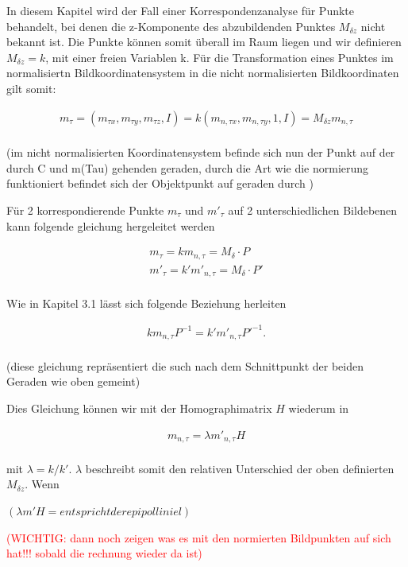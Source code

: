  In diesem Kapitel wird der Fall einer Korrespondenzanalyse für Punkte behandelt, bei denen die z-Komponente des abzubildenden Punktes $M_{\delta z}$ nicht bekannt ist. Die Punkte können somit überall im Raum liegen und wir definieren $M_{\delta z}=k$, mit einer freien Variablen k. Für die Transformation eines Punktes im normalisiertn Bildkoordinatensystem in die nicht normalisierten Bildkoordinaten gilt somit:
 
 \begin{gather}
 	m_{\tau}=(m_{\tau x},m_{\tau y},m_{\tau z}, I) = k(m_{n,\tau x},m_{n,\tau y},1, I)=M_{\delta z}m_{n,\tau}
 \end{gather}\\
 (im nicht normalisierten Koordinatensystem befinde sich nun der Punkt auf der durch C und m(Tau) gehenden geraden, durch die Art wie die normierung funktioniert befindet sich der Objektpunkt auf geraden durch )
 
 
 
 Für 2 korrespondierende Punkte $m_{\tau}$ und $m'_{\tau}$ auf 2 unterschiedlichen Bildebenen kann folgende gleichung hergeleitet werden
 
 
 \begin{gather}
 	m_{\tau}=km_{n,\tau} = M_{\delta} \cdot P \\
 	m'_{\tau}=k'm'_{n,\tau} = M_{\delta} \cdot P'
 \end{gather}\\
 
 Wie in Kapitel 3.1 lässt sich folgende Beziehung herleiten
 
 \begin{gather}
 	km_{n,\tau}P^{-1}  = k'm'_{n,\tau}P'^{-1}.
 \end{gather}\\
 (diese gleichung repräsentiert die such nach dem Schnittpunkt der beiden Geraden wie oben gemeint)\
 
 Dies Gleichung können wir mit der Homographimatrix $H$ wiederum in 
 
 \begin{gather}
 	m_{n,\tau} =\lambda  m'_{n,\tau}H
 \end{gather}\\
 
 mit $\lambda=k/k'$. $\lambda$ beschreibt somit den relativen Unterschied der oben definierten $M_{\delta z}$. Wenn  
 
 $(\lambda m'H  =entspricht der epipollinie l)$


\textcolor{red}{(WICHTIG: dann noch zeigen was es mit den normierten Bildpunkten auf sich hat!!! sobald die rechnung wieder da ist)}



